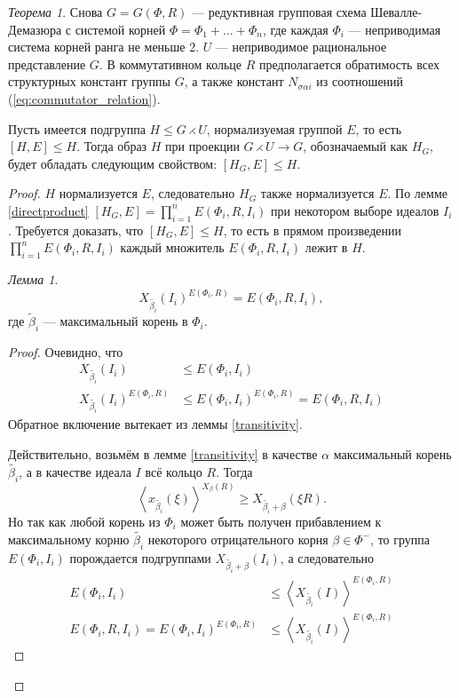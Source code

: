 \documentclass[15pt]{article}
\theoremstyle{remark}
\newtheorem{thm}{Теорема}
\newtheorem{lm}{Лемма}
\renewcommand{\le}{\leqslant}
\renewcommand{\ge}{\geqslant}
\begin{document}
\begin{thm}
  Снова $G = G(\Phi, R)$ --- редуктивная групповая схема Шевалле-Демазюра
  с системой корней $\Phi = \Phi_1 + \ldots + \Phi_n$, где каждая $\Phi_i$ --- неприводимая система корней ранга не меньше $2$. $U$ --- неприводимое рациональное представление $G$. В коммутативном кольце $R$ предполагается обратимость всех структурных констант группы $G$, а также констант $N_{\sigma\alpha i}$ из соотношений (\ref{eq:commutator_relation}).
    
  Пусть имеется подгруппа $H \le G \rightthreetimes U$, нормализуемая группой $E$, то есть $[H,E] \le H$. Тогда образ $H$ при проекции $G \rightthreetimes U \rightarrow G$, обозначаемый как $H_G$, будет обладать следующим свойством: $[H_G,E]\le H$.
\end{thm}
\begin{proof}
  $H$ нормализуется $E$, следовательно $H_G$ также нормализуется $E$. По лемме \ref{directproduct} $[H_G,E] = \prod_{i=1}^n E(\Phi_i,R,I_i)$ при некотором выборе идеалов $I_i$. Требуется доказать, что $[H_G,E] \le H$, то есть в прямом произведении $\prod_{i=1}^n E(\Phi_i,R,I_i)$ каждый множитель $E(\Phi_i,R,I_i)$  лежит в $H$.
  
\begin{lm}
  $$X_{\widetilde{\beta_i}}(I_i)^{E(\Phi_i,R)} = E(\Phi_i,R,I_i),$$
  где $\widetilde{\beta}_i$ --- максимальный корень в $\Phi_i$.
\end{lm}
\begin{proof}
  Очевидно, что
\begin{align*}
  X_{\widetilde{\beta_i}}(I_i) &\le E(\Phi_i,I_i) \\
  X_{\widetilde{\beta_i}}(I_i)^{E(\Phi_i,R)} &\le E(\Phi_i,I_i)^{E(\Phi_i,R)} = E(\Phi_i,R,I_i)
\end{align*}
  Обратное включение вытекает из леммы \ref{transitivity}.
  
  Действительно, возьмём в лемме \ref{transitivity} в качестве $\alpha$ максимальный корень $\widetilde{\beta_i}$, а в качестве идеала $I$ всё кольцо $R$. Тогда
  $$ \left< x_{\widetilde{\beta_i}}(\xi) \right>^{X_\beta(R)} \ge X_{\widetilde{\beta_i} + \beta}(\xi R). $$
  Но так как любой корень из $\Phi_i$ может быть получен прибавлением к максимальному корню $\widetilde{\beta_i}$ некоторого отрицательного корня $\beta \in \Phi^-$, то группа $E(\Phi_i,I_i)$ порождается подгруппами $X_{\widetilde{\beta_i} + \beta}(I_i)$, а следовательно 
\begin{align*}
E(\Phi_i,I_i) &\le \left< X_{\widetilde{\beta_i}}(I) \right>^{E(\Phi_i,R)}\\
  E(\Phi_i,R,I_i) = E(\Phi_i,I_i)^{E(\Phi_i,R)} &\le \left< X_{\widetilde{\beta_i}}(I) \right>^{E(\Phi_i,R)}
\end{align*}
\end{proof}


\end{proof}
\end{document}
